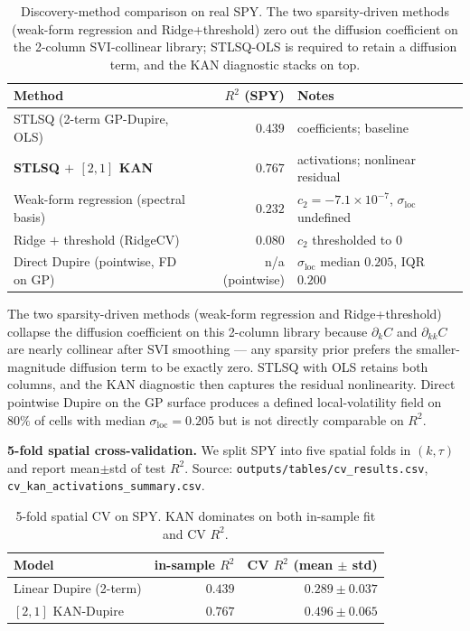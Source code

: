 \documentclass[10pt]{article}
\begin{document}
\begin{table}[h]
\centering\footnotesize
\caption{Discovery-method comparison on real SPY. The two sparsity-driven methods (weak-form regression and Ridge+threshold) zero out the diffusion coefficient on the 2-column SVI-collinear library; STLSQ-OLS is required to retain a diffusion term, and the KAN diagnostic stacks on top.}
\label{tab:discovery-methods}
\begin{tabular}{lrl}
\toprule
Method & $R^2$ (SPY) & Notes \\
\midrule
STLSQ (2-term GP-Dupire, OLS)         & $0.439$ & coefficients; baseline \\
\textbf{STLSQ $+$ $[2,1]$ KAN}        & $\mathbf{0.767}$ & activations; nonlinear residual \\
Weak-form regression (spectral basis) & $0.232$ & $c_2{=}-7.1\!\times\!10^{-7}$, $\sigma_{\text{loc}}$ undefined \\
Ridge $+$ threshold (RidgeCV)         & $0.080$ & $c_2$ thresholded to $0$ \\
Direct Dupire (pointwise, FD on GP)   & n/a (pointwise) & $\sigma_{\text{loc}}$ median $0.205$, IQR $0.200$ \\
\bottomrule
\end{tabular}
\end{table}

The two sparsity-driven methods (weak-form regression and Ridge+threshold) collapse the diffusion coefficient on this 2-column library because $\partial_k C$ and $\partial_{kk} C$ are nearly collinear after SVI smoothing --- any sparsity prior prefers the smaller-magnitude diffusion term to be exactly zero. STLSQ with OLS retains both columns, and the KAN diagnostic then captures the residual nonlinearity. Direct pointwise Dupire on the GP surface produces a defined local-volatility field on $80\%$ of cells with median $\sigma_{\text{loc}}{=}0.205$ but is not directly comparable on $R^2$.

\textbf{5-fold spatial cross-validation.} We split SPY into five spatial folds in $(k,\tau)$ and report mean$\pm$std of test $R^2$. Source: \texttt{outputs/tables/cv\_results.csv}, \texttt{cv\_kan\_activations\_summary.csv}.

\begin{table}[h]
\centering\footnotesize
\caption{5-fold spatial CV on SPY. KAN dominates on both in-sample fit and CV $R^2$.}
\label{tab:cv}
\begin{tabular}{lrr}
\toprule
Model & in-sample $R^2$ & CV $R^2$ (mean $\pm$ std) \\
\midrule
Linear Dupire (2-term) & $0.439$ & $0.289 \pm 0.037$ \\
$[2,1]$ KAN-Dupire     & $\mathbf{0.767}$ & $\mathbf{0.496 \pm 0.065}$ \\
\bottomrule
\end{tabular}
\end{table}
\end{document}
